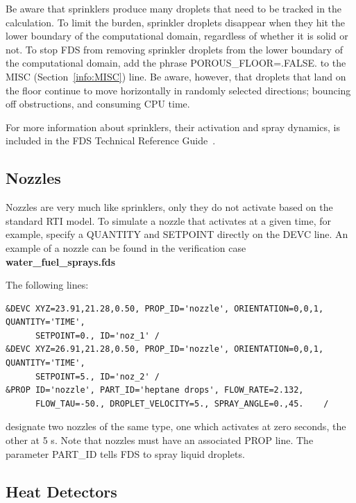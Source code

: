 \documentclass[11pt]{book}
\begin{document}
\noindent
Be aware that sprinklers produce many droplets that need to be
tracked in the calculation. To limit the burden, sprinkler droplets disappear when they hit the
lower boundary of the computational domain, regardless of whether it is solid
or not. To stop FDS from removing sprinkler droplets from the lower boundary of the computational domain,
add the phrase {\ct POROUS\_FLOOR=.FALSE.} to the {\ct MISC} (Section~\ref{info:MISC}) line. Be aware, however, that
droplets that land on the floor continue to move horizontally in randomly selected
directions; bouncing off obstructions, and consuming CPU time.

\noindent
For more information about sprinklers, their activation and spray dynamics, is included in the FDS
Technical Reference Guide~\cite{FDS_Tech_Guide_5}.



\subsection{Nozzles}
\label{info:nozzles}

Nozzles are very much like sprinklers, only they do not activate based on the standard RTI model.
To simulate a nozzle that activates at a given time, for example,
specify a {\ct QUANTITY} and {\ct SETPOINT} directly on the {\ct DEVC} line.
An example of a nozzle can be found in the verification case {\bf water\_fuel\_sprays.fds}

The following lines:
\footnotesize
\begin{verbatim}
&DEVC XYZ=23.91,21.28,0.50, PROP_ID='nozzle', ORIENTATION=0,0,1, QUANTITY='TIME',
      SETPOINT=0., ID='noz_1' /
&DEVC XYZ=26.91,21.28,0.50, PROP_ID='nozzle', ORIENTATION=0,0,1, QUANTITY='TIME',
      SETPOINT=5., ID='noz_2' /
&PROP ID='nozzle', PART_ID='heptane drops', FLOW_RATE=2.132,
      FLOW_TAU=-50., DROPLET_VELOCITY=5., SPRAY_ANGLE=0.,45.    /
\end{verbatim}
\normalsize

\noindent
designate two nozzles of the same type, one which activates at zero seconds, the other at 5 s. Note that nozzles must have an
associated {\ct PROP} line. The parameter {\ct PART\_ID} tells FDS to spray liquid droplets.




\subsection{Heat Detectors}
\label{info:heat_detectors}
\end{document}
